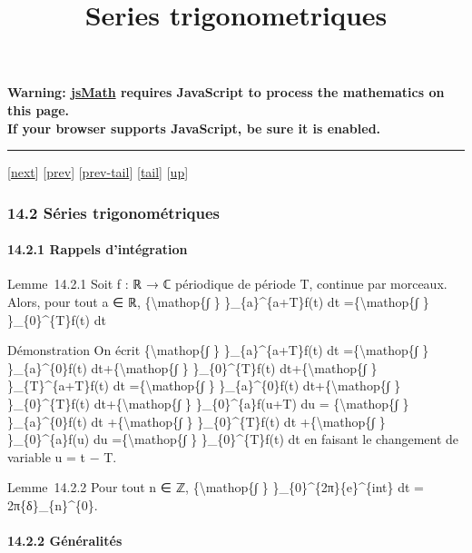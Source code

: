 \documentclass[]{article}
\title{Series trigonometriques}
\author{}
\date{}
\begin{document}
\maketitle

\textbf{Warning: \href{http://www.math.union.edu/locate/jsMath}{jsMath}
requires JavaScript to process the mathematics on this page.\\ If your
browser supports JavaScript, be sure it is enabled.}

\begin{center}\rule{3in}{0.4pt}\end{center}

{[}\href{coursse79.html}{next}{]} {[}\href{coursse77.html}{prev}{]}
{[}\href{coursse77.html\#tailcoursse77.html}{prev-tail}{]}
{[}\hyperref[tailcoursse78.html]{tail}{]}
{[}\href{coursch15.html\#coursse78.html}{up}{]}

\subsubsection{14.2 Séries trigonométriques}

\paragraph{14.2.1 Rappels d'intégration}

Lemme~14.2.1 Soit f : ℝ → ℂ périodique de période T, continue par
morceaux. Alors, pour tout a ∈ ℝ, \{\textbackslash{}mathop\{∫ \}
\}\_\{a\}\^{}\{a+T\}f(t) dt =\{\textbackslash{}mathop\{∫ \}
\}\_\{0\}\^{}\{T\}f(t) dt

Démonstration On écrit \{\textbackslash{}mathop\{∫ \}
\}\_\{a\}\^{}\{a+T\}f(t) dt =\{\textbackslash{}mathop\{∫ \}
\}\_\{a\}\^{}\{0\}f(t) dt+\{\textbackslash{}mathop\{∫ \}
\}\_\{0\}\^{}\{T\}f(t) dt+\{\textbackslash{}mathop\{∫ \}
\}\_\{T\}\^{}\{a+T\}f(t) dt =\{\textbackslash{}mathop\{∫ \}
\}\_\{a\}\^{}\{0\}f(t) dt+\{\textbackslash{}mathop\{∫ \}
\}\_\{0\}\^{}\{T\}f(t) dt+\{\textbackslash{}mathop\{∫ \}
\}\_\{0\}\^{}\{a\}f(u+T) du = \{\textbackslash{}mathop\{∫ \}
\}\_\{a\}\^{}\{0\}f(t) dt +\{\textbackslash{}mathop\{∫ \}
\}\_\{0\}\^{}\{T\}f(t) dt +\{\textbackslash{}mathop\{∫ \}
\}\_\{0\}\^{}\{a\}f(u) du =\{\textbackslash{}mathop\{∫ \}
\}\_\{0\}\^{}\{T\}f(t) dt en faisant le changement de variable u = t −
T.

Lemme~14.2.2 Pour tout n ∈ ℤ, \{\textbackslash{}mathop\{∫ \}
\}\_\{0\}\^{}\{2π\}\{e\}\^{}\{int\} dt = 2π\{δ\}\_\{n\}\^{}\{0\}.

\paragraph{14.2.2 Généralités}
\end{document}
